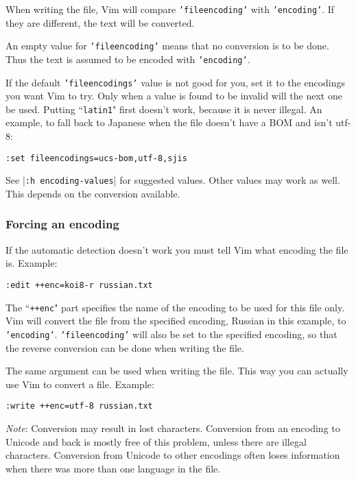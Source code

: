 When writing the file, Vim will compare \texttt{'fileencoding'} with \texttt{'encoding'}.
If they are different, the text will be converted.

An empty value for \texttt{'fileencoding'} means that no conversion is to be done.
Thus the text is assumed to be encoded with \texttt{'encoding'}.

If the default \texttt{'fileencodings'} value is not good for you, set it to the encodings you want Vim to try.
Only when a value is found to be invalid will the next one be used.
Putting ``\texttt{latin1}" first doesn't work, because it is never illegal.
An example, to fall back to Japanese when the file doesn't have a BOM and isn't utf-8:

\begin{Verbatim}[samepage=true]
 :set fileencodings=ucs-bom,utf-8,sjis
\end{Verbatim}

See |\texttt{:h encoding-values}| for suggested values.
Other values may work as well.
This depends on the conversion available.

\subsubsection{Forcing an encoding}
If the automatic detection doesn't work you must tell Vim what encoding the file is.
Example:

\begin{Verbatim}[samepage=true]
 :edit ++enc=koi8-r russian.txt
\end{Verbatim}

The ``\texttt{++enc}" part specifies the name of the encoding to be used for this file only.
Vim will convert the file from the specified encoding, Russian in this example, to \texttt{'encoding'}.
\texttt{'fileencoding'} will also be set to the specified encoding, so that the reverse conversion can be done when writing the file.

The same argument can be used when writing the file.
This way you can actually use Vim to convert a file.
Example:

\begin{Verbatim}[samepage=true]
 :write ++enc=utf-8 russian.txt
\end{Verbatim}

\emph{Note}: Conversion may result in lost characters.
Conversion from an encoding to Unicode and back is mostly free of this problem, unless there are illegal characters.
Conversion from Unicode to other encodings often loses information when there was more than one language in the file.

